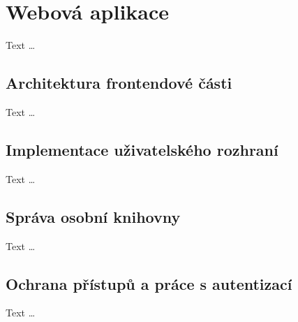
\section{Webová aplikace}
Text \dots


\subsection{Architektura frontendové části}
Text \dots


\subsection{Implementace uživatelského rozhraní}
Text \dots


\subsection{Správa osobní knihovny}
Text \dots


\subsection{Ochrana přístupů a práce s autentizací}
Text \dots



